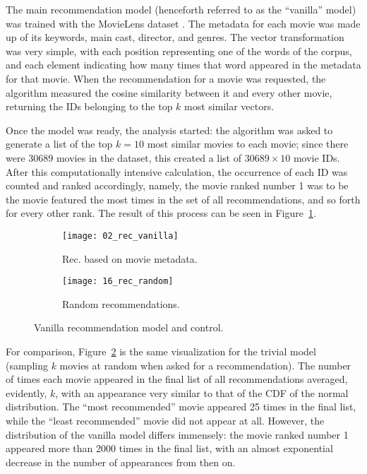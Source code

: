 The main recommendation model (henceforth referred to as the ``vanilla'' model)
was trained with the MovieLens dataset \citep{harper_movielens_2015}. The
metadata for each movie was made up of its keywords, main cast, director, and
genres. The vector transformation was very simple, with each position
representing one of the words of the corpus, and each element indicating how
many times that word appeared in the metadata for that movie. When the
recommendation for a movie was requested, the algorithm measured the cosine
similarity between it and every other movie, returning the IDs belonging to
the top $k$ most similar vectors.

Once the model was ready, the analysis started: the algorithm was asked to
generate a list of the top $k = 10$ most similar movies to each movie; since
there were 30689 movies in the dataset, this created a list of $30689 \times 10$
movie IDs. After this computationally intensive calculation, the occurrence of
each ID was counted and ranked accordingly, namely, the movie ranked number 1
was to be the movie featured the most times in the set of all recommendations,
and so forth for every other rank. The result of this process can be seen in
Figure~\ref{fig:fig1:a}.

\begin{figure}
  \centering
  \begin{subfigure}{0.45\textwidth}
    \centering
    \texttt{[image: 02\_rec\_vanilla]}
    \caption{Rec. based on movie metadata.\label{fig:fig1:a}}
  \end{subfigure}
  \begin{subfigure}{0.45\textwidth}
    \centering
    \texttt{[image: 16\_rec\_random]}
    \caption{Random recommendations.\label{fig:fig1:b}}
  \end{subfigure}
  \caption{Vanilla recommendation model and control.\label{fig:fig1}}
\end{figure}

For comparison, Figure~\ref{fig:fig1:b} is the same visualization for the
trivial model (sampling $k$ movies at random when asked for a recommendation).
The number of times each movie appeared in the final list of all recommendations
averaged, evidently, $k$, with an appearance very similar to that of the CDF of
the normal distribution. The ``most recommended'' movie appeared 25 times in the
final list, while the ``least recommended'' movie did not appear at all.
However, the distribution of the vanilla model differs immensely: the movie
ranked number 1 appeared more than 2000 times in the final list, with an almost
exponential decrease in the number of appearances from then on.

